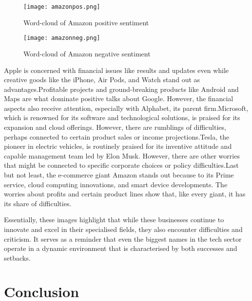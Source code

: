 \documentclass[12pt, a4paper,twoside]{report}
\theoremstyle{plain} %
\theoremstyle{definition} %
\theoremstyle{remark} %
\numberwithin{equation}{chapter}
\begin{document}
    
    \begin{figure}
      \centering
\texttt{[image: amazonpos.png]}\label{fig:f1e}
      \caption{Word-cloud of Amazon positive sentiment}
    \end{figure}
\begin{figure}
      \centering
      \texttt{[image: amazonneg.png]}\label{fig:f2e}
      \caption{Word-cloud of Amazon  negative sentiment}
    \end{figure}

    Apple is concerned with financial issues like results and updates even while creative goods like the iPhone, Air Pods, and Watch stand out as advantages.Profitable projects and ground-breaking products like Android and Maps are what dominate positive talks about Google. However, the financial aspects also receive attention, especially with Alphabet, its parent firm.Microsoft, which is renowned for its software and technological solutions, is praised for its expansion and cloud offerings. However, there are rumblings of difficulties, perhaps connected to certain product sales or income projections.Tesla, the pioneer in electric vehicles, is routinely praised for its inventive attitude and capable management team led by Elon Musk. However, there are other worries that might be connected to specific corporate choices or policy difficulties.Last but not least, the e-commerce giant Amazon stands out because to its Prime service, cloud computing innovations, and smart device developments. The worries about profits and certain product lines show that, like every giant, it has its share of difficulties.
    
    Essentially, these images highlight that while these businesses continue to innovate and excel in their specialised fields, they also encounter difficulties and criticism. It serves as a reminder that even the biggest names in the tech sector operate in a dynamic environment that is characterised by both successes and setbacks.

\chapter{Conclusion}\label{ch:6}
\end{document}
